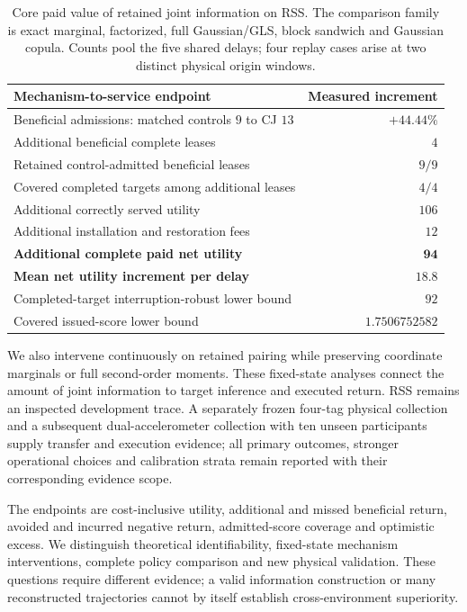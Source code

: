 \documentclass[10pt]{article}
\begin{document}
\begin{table}[t]
\centering\small
\caption{Core paid value of retained joint information on RSS. The
comparison family is exact marginal, factorized, full Gaussian/GLS,
block sandwich and Gaussian copula. Counts pool the five shared delays;
four replay cases arise at two distinct physical origin windows.}
\label{tab:core-paid-pairing-value}
\begin{tabular}{p{.63\linewidth}r}
\toprule
Mechanism-to-service endpoint & Measured increment\\
\midrule
Beneficial admissions: matched controls $9$ to CJ $13$ & $+44.44\%$\\
Additional beneficial complete leases & $4$\\
Retained control-admitted beneficial leases & $9/9$\\
Covered completed targets among additional leases & $4/4$\\
Additional correctly served utility & $106$\\
Additional installation and restoration fees & $12$\\
\textbf{Additional complete paid net utility} & $\mathbf{94}$\\
\textbf{Mean net utility increment per delay} & $\mathbf{18.8}$\\
Completed-target interruption-robust lower bound & $92$\\
Covered issued-score lower bound & $1.7506752582$\\
\bottomrule
\end{tabular}
\end{table}

We also intervene continuously on retained pairing while preserving
coordinate marginals or full second-order moments. These fixed-state
analyses connect the amount of joint information to target inference and
executed return. RSS remains an inspected development trace. A separately
frozen four-tag physical collection and a subsequent dual-accelerometer
collection with ten unseen participants supply transfer and execution evidence;
all primary outcomes, stronger operational choices and calibration strata
remain reported with their corresponding evidence scope.

The endpoints are cost-inclusive utility, additional and missed beneficial
return, avoided and incurred negative return, admitted-score coverage and
optimistic excess. We distinguish theoretical identifiability, fixed-state
mechanism interventions, complete policy comparison and new physical
validation. These questions require different evidence; a valid information
construction or many reconstructed trajectories cannot by itself establish
cross-environment superiority.
\end{document}
